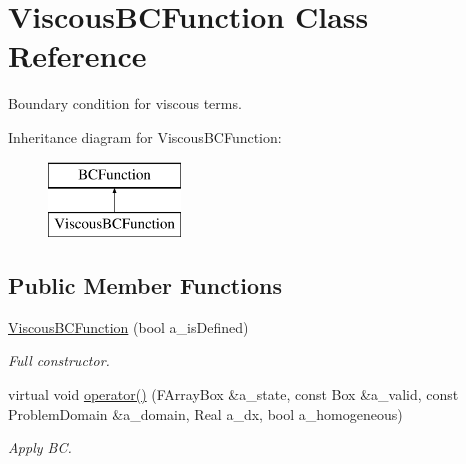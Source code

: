 \hypertarget{class_viscous_b_c_function}{\section{Viscous\-B\-C\-Function Class Reference}
\label{class_viscous_b_c_function}
}


Boundary condition for viscous terms.  


Inheritance diagram for Viscous\-B\-C\-Function\-:\begin{figure}[H]
\begin{center}
\leavevmode
\includegraphics[height=2.000000cm]{class_viscous_b_c_function}
\end{center}
\end{figure}
\subsection*{Public Member Functions}
\begin{DoxyCompactItemize}
\item 
\hypertarget{class_viscous_b_c_function_af384ed785272bc488068f2bf5d3b3dfe}{\hyperlink{class_viscous_b_c_function_af384ed785272bc488068f2bf5d3b3dfe}{Viscous\-B\-C\-Function} (bool a\-\_\-is\-Defined)}\label{class_viscous_b_c_function_af384ed785272bc488068f2bf5d3b3dfe}

\begin{DoxyCompactList}\small\item\em Full constructor. \end{DoxyCompactList}\item 
\hypertarget{class_viscous_b_c_function_a4f2118634f47a999eb0edfdef10c02fd}{virtual void \hyperlink{class_viscous_b_c_function_a4f2118634f47a999eb0edfdef10c02fd}{operator()} (F\-Array\-Box \&a\-\_\-state, const Box \&a\-\_\-valid, const Problem\-Domain \&a\-\_\-domain, Real a\-\_\-dx, bool a\-\_\-homogeneous)}\label{class_viscous_b_c_function_a4f2118634f47a999eb0edfdef10c02fd}

\begin{DoxyCompactList}\small\item\em Apply B\-C. \end{DoxyCompactList}\end{DoxyCompactItemize}
